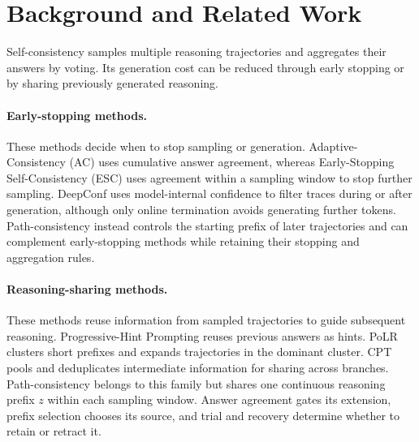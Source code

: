 \section{Background and Related Work}
Self-consistency samples multiple reasoning trajectories and aggregates their answers by voting. Its generation cost can be reduced through early stopping or by sharing previously generated reasoning.

\paragraph{Early-stopping methods.}
These methods decide when to stop sampling or generation.
Adaptive-Consistency (AC) uses cumulative answer agreement, whereas Early-Stopping Self-Consistency (ESC) uses agreement within a sampling window to stop further sampling.
DeepConf uses model-internal confidence to filter traces during or after generation, although only online termination avoids generating further tokens. Path-consistency instead controls the starting prefix of later trajectories and can complement early-stopping methods while retaining their stopping and aggregation rules.

\paragraph{Reasoning-sharing methods.}
These methods reuse information from sampled trajectories to guide subsequent reasoning.
Progressive-Hint Prompting reuses previous answers as hints.
PoLR clusters short prefixes and expands trajectories in the dominant cluster.
CPT pools and deduplicates intermediate information for sharing across branches. Path-consistency belongs to this family but shares one continuous reasoning prefix $z$ within each sampling window. Answer agreement gates its extension, prefix selection chooses its source, and trial and recovery determine whether to retain or retract it.
